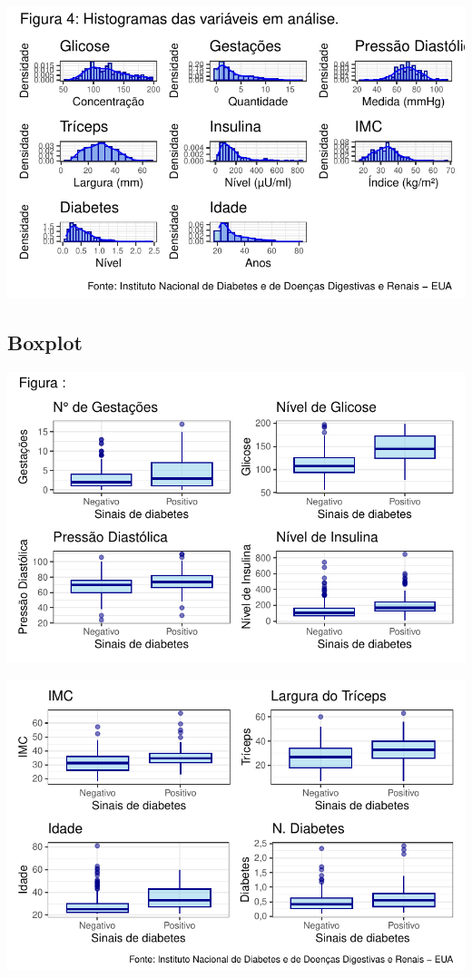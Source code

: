 \documentclass[
  letterpaper,
  DIV=11,
  numbers=noendperiod]{scrartcl}
\begin{document}
\includegraphics{relatorio_lab1_files/figure-pdf/unnamed-chunk-8-1.pdf}

\hypertarget{boxplot}{%
\subsection{Boxplot}\label{boxplot}}

\includegraphics{relatorio_lab1_files/figure-pdf/unnamed-chunk-9-1.pdf}

\includegraphics{relatorio_lab1_files/figure-pdf/unnamed-chunk-9-2.pdf}
\end{document}
